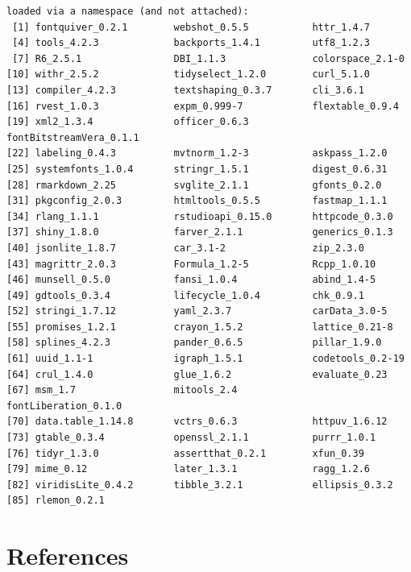 \documentclass[
  letterpaper,
  DIV=11,
  numbers=noendperiod]{scrreprt}
\begin{document}
\begin{verbatim}
loaded via a namespace (and not attached):
 [1] fontquiver_0.2.1        webshot_0.5.5           httr_1.4.7             
 [4] tools_4.2.3             backports_1.4.1         utf8_1.2.3             
 [7] R6_2.5.1                DBI_1.1.3               colorspace_2.1-0       
[10] withr_2.5.2             tidyselect_1.2.0        curl_5.1.0             
[13] compiler_4.2.3          textshaping_0.3.7       cli_3.6.1              
[16] rvest_1.0.3             expm_0.999-7            flextable_0.9.4        
[19] xml2_1.3.4              officer_0.6.3           fontBitstreamVera_0.1.1
[22] labeling_0.4.3          mvtnorm_1.2-3           askpass_1.2.0          
[25] systemfonts_1.0.4       stringr_1.5.1           digest_0.6.31          
[28] rmarkdown_2.25          svglite_2.1.1           gfonts_0.2.0           
[31] pkgconfig_2.0.3         htmltools_0.5.5         fastmap_1.1.1          
[34] rlang_1.1.1             rstudioapi_0.15.0       httpcode_0.3.0         
[37] shiny_1.8.0             farver_2.1.1            generics_0.1.3         
[40] jsonlite_1.8.7          car_3.1-2               zip_2.3.0              
[43] magrittr_2.0.3          Formula_1.2-5           Rcpp_1.0.10            
[46] munsell_0.5.0           fansi_1.0.4             abind_1.4-5            
[49] gdtools_0.3.4           lifecycle_1.0.4         chk_0.9.1              
[52] stringi_1.7.12          yaml_2.3.7              carData_3.0-5          
[55] promises_1.2.1          crayon_1.5.2            lattice_0.21-8         
[58] splines_4.2.3           pander_0.6.5            pillar_1.9.0           
[61] uuid_1.1-1              igraph_1.5.1            codetools_0.2-19       
[64] crul_1.4.0              glue_1.6.2              evaluate_0.23          
[67] msm_1.7                 mitools_2.4             fontLiberation_0.1.0   
[70] data.table_1.14.8       vctrs_0.6.3             httpuv_1.6.12          
[73] gtable_0.3.4            openssl_2.1.1           purrr_1.0.1            
[76] tidyr_1.3.0             assertthat_0.2.1        xfun_0.39              
[79] mime_0.12               later_1.3.1             ragg_1.2.6             
[82] viridisLite_0.4.2       tibble_3.2.1            ellipsis_0.3.2         
[85] rlemon_0.2.1           
\end{verbatim}

\hypertarget{references-1}{%
\section*{References}\label{references-1}}
\end{document}
